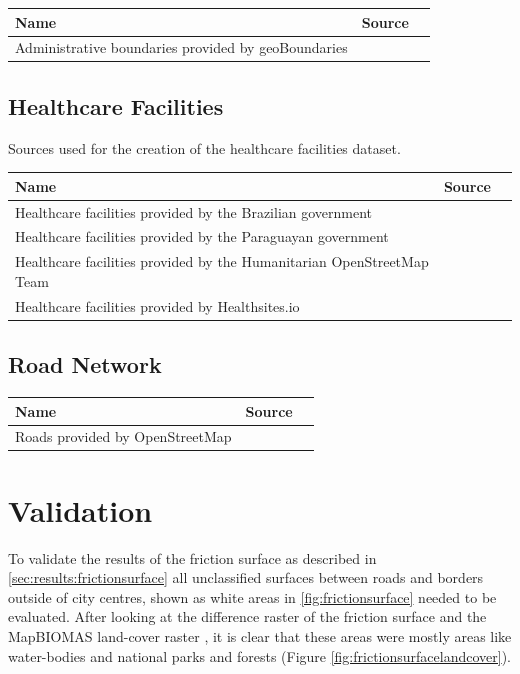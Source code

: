\documentclass[11pt, a4paper]{report}
\begin{document}
\begin{longtable}{|p{3cm}|p{10cm}|l|}
    \hline
    \textbf{Name}& \textbf{Source}\\
    \hline
    Administrative boundaries provided by geoBoundaries & \cite{runfola_geoboundaries_2020}\\
    \hline
\end{longtable}


\section{Healthcare Facilities}
Sources used for the creation of the healthcare facilities dataset.
\begin{longtable}{|p{3cm}|p{10cm}|l|}
    \hline
    \textbf{Name}& \textbf{Source}\\
    \hline
    Healthcare facilities provided by the Brazilian government &\cite{ministerio_da_saude_hospitais_2024}\\
    \hline
    Healthcare facilities provided by the Paraguayan government& \cite{ministerio_de_salud_publica_mspbsgovpy_2024}\\
    \hline
    Healthcare facilities provided by the Humanitarian OpenStreetMap Team
    &\cite{humanitatiran_openstreetmap_team_hotosmorg_2024}\\
    \hline
    Healthcare facilities provided by Healthsites.io &\cite{hostettler_healthsitesio_2018}\\
    \hline
\end{longtable}


\section{Road Network}

\begin{longtable}{|p{3cm}|p{10cm}|l|}
    \hline
    \textbf{Name}& \textbf{Source} \\
    \hline
    Roads provided by OpenStreetMap
    & \cite{olbricht_drolbroverpass-api_2024}\\
    \hline

    
\end{longtable}

\chapter{Validation}\label{sec:validation:frictionsurface}
To validate the results of the friction surface as described in \ref{sec:results:frictionsurface} all unclassified surfaces between roads and borders outside of city centres, shown as white areas in \ref{fig:frictionsurface} needed to be evaluated.
After looking at the difference raster of the friction surface and the MapBIOMAS land-cover raster \citet{souza_reconstructing_2020}, it is clear that these areas were mostly areas like water-bodies and national parks and forests (Figure \ref{fig:frictionsurfacelandcover}). 
\end{document}
